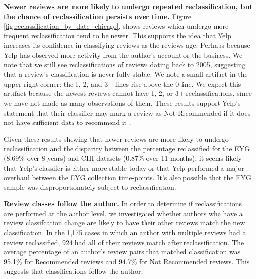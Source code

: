 \textbf{Newer reviews are more likely to undergo repeated reclassification, but the chance of reclassification persists over time.} Figure \ref{fig:reclassification_by_date_chicago}, shows reviews which undergo more frequent reclassification tend to be newer. This supports the idea that Yelp increases its confidence in classifying reviews as the reviews age. Perhaps because Yelp has observed more activity from the author's account or the business. We note that we still see reclassifications of reviews dating back to 2005, suggesting that a review's classification is never fully stable.
We note a small artifact in the upper-right corner: the 1, 2, and 3+ lines rise above the 0 line. We expect this artifact because the newest reviews cannot have 1, 2, or 3+ reclassifications, since we have not made as many observations of them. These results support Yelp's statement that their classifier may mark a review as Not Recommended if it does not have sufficient data to recommend it \cite{yelprecommendationsoftware}.

Given these results showing that newer reviews are more likely to undergo reclassification and the disparity between the percentage reclassified for the EYG (8.69\% over 8 years) and CHI datasets (0.87\% over 11 months), it seems likely that Yelp's classifer is either more stable today or that Yelp performed a major overhaul between the EYG collection time-points. It's also possible that the EYG sample was disproportionately subject to reclassification.



\textbf{Review classes follow the author.} In order to determine if reclassifications are performed at the author level, we investigated whether authors who have a review classifcation change are likely to have their other reviews match the new classification. In the 1,175 cases in which an author with multiple reviews had a review reclassified, 924 had all of their reviews match after reclassification. The average percentage of an author's review pairs that matched classification was 95.1\% for Recommended reviews and 94.7\% for Not Recommended reviews. This suggests that classifications follow the author.

